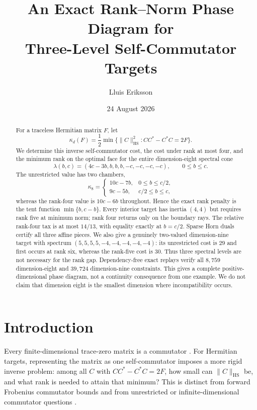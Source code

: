 \documentclass[11pt]{article}
\title{An Exact Rank--Norm Phase Diagram for\\
Three-Level Self-Commutator Targets}
\author{Lluis Eriksson}
\date{24 August 2026}
\newcommand{\HS}{\mathrm{HS}}
\begin{document}
\maketitle

\begin{abstract}
For a traceless Hermitian matrix $F$, let
\[
 \kappa_d(F)=\frac12\min\{\|C\|_{\HS}^2:CC^*-C^*C=2F\}.
\]
We determine this inverse self-commutator cost, the cost under rank at most
four, and the minimum rank on the optimal face for the entire dimension-eight
spectral cone
\[
 \lambda(b,c)=(4c-3b,b,b,b,-c,-c,-c,-c),\qquad 0\le b\le c.
\]
The unrestricted value has two chambers,
\[
 \kappa_8=\begin{cases}10c-7b,&0\le b\le c/2,\\
                         9c-5b,&c/2\le b\le c,
          \end{cases}
\]
whereas the rank-four value is $10c-6b$ throughout.  Hence the exact rank
penalty is the tent function $\min\{b,c-b\}$.  Every interior target has
inertia $(4,4)$ but requires rank five at minimum norm; rank four returns only
on the boundary rays.  The relative rank-four tax is at most $14/13$, with
 equality exactly at $b=c/2$.  Sparse Horn duals certify all three affine
pieces.  We also give a genuinely two-valued dimension-nine target with
spectrum $(5,5,5,5,-4,-4,-4,-4,-4)$: its unrestricted cost is $29$ and first
occurs at rank six, whereas the rank-five cost is $30$.  Thus three spectral
levels are not necessary for the rank gap.  Dependency-free exact replays
verify all $8{,}759$ dimension-eight and $39{,}724$ dimension-nine constraints.
This gives a complete positive-dimensional phase diagram, not a continuity
consequence from one example.  We do not claim that dimension eight is the
smallest dimension where incompatibility occurs.
\end{abstract}

\section{Introduction}

Every finite-dimensional trace-zero matrix is a commutator
\cite{albert1957,thompson1958}.  For Hermitian targets, representing the
matrix as one self-commutator imposes a more rigid inverse problem: among all
$C$ with $CC^*-C^*C=2F$, how small can $\|C\|_{\HS}$ be, and what rank is
needed to attain that minimum?  This is distinct from forward Frobenius
commutator bounds \cite{bottcher2005,bottcher2008} and from unrestricted or
infinite-dimensional commutator questions \cite{weiss1980,fan1980}.
\end{document}
